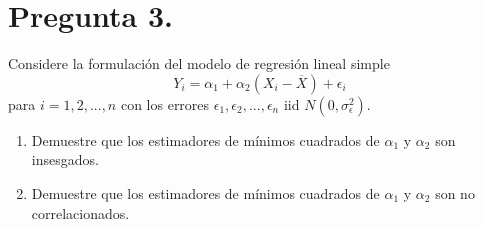 \documentclass[12pt,a4paper]{article}
\begin{document}

\section*{Pregunta 3.}
Considere la formulación del modelo de regresión lineal simple 
$$Y_{i}=\alpha_{1}+\alpha_{2}(X_{i}-\overline{X})+\epsilon_{i}$$ 
para $i=1,2,...,n$ con los errores $\epsilon_{1},\epsilon_{2},...,\epsilon_{n}$ iid $N(0,\sigma_{\epsilon}^{2})$.
\begin{enumerate}[label=\alph{enumi})]
    \item Demuestre que los estimadores de mínimos cuadrados de $\alpha_{1}$ y $\alpha_{2}$ son insesgados.
    \item Demuestre que los estimadores de mínimos cuadrados de $\alpha_{1}$ y $\alpha_{2}$ son no correlacionados.
\end{enumerate}
\end{document}
